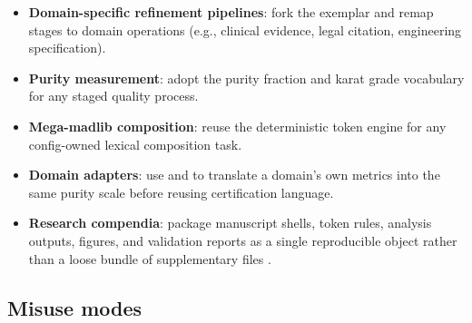 \documentclass[
]{article}
\providecommand{\tightlist}{%
  \setlength{\itemsep}{0pt}\setlength{\parskip}{0pt}}
\begin{document}
\begin{itemize}
\tightlist
\item
  \textbf{Domain-specific refinement pipelines}: fork the exemplar and
  remap stages to domain operations (e.g., clinical evidence, legal
  citation, engineering specification).
\item
  \textbf{Purity measurement}: adopt the purity fraction and karat grade
  vocabulary for any staged quality process.
\item
  \textbf{Mega-madlib composition}: reuse the deterministic token engine
  for any config-owned lexical composition task.
\item
  \textbf{Domain adapters}: use  and
   to translate a domain's own metrics into
  the same purity scale before reusing certification language.
\item
  \textbf{Research compendia}: package manuscript shells, token rules,
  analysis outputs, figures, and validation reports as a single
  reproducible object rather than a loose bundle of supplementary files
  \citep{marwick2018packaging}.
\end{itemize}

\subsection{Misuse modes}\label{misuse-modes}
\end{document}
